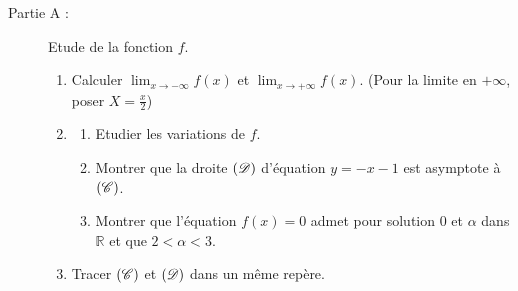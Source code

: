       \begin{description}
            \item[Partie A : ] Etude de la fonction $f$. \\[-1\baselineskip]
                  \begin{enumerate}
                        \item Calculer $\lim_{x\rightarrow -\infty} f(x)$ et $\lim_{x\rightarrow +\infty} f(x)$.
                              (Pour la limite en $+\infty$, poser $X = \frac{x}{2}$)
                        \item \begin{enumerate}
                                    \item Etudier les variations de $f$.
                                    \item Montrer que la droite $(\mathscr{D})$ d'\'equation $y = - x - 1$ est asymptote \`a $(\mathscr{C})$.
                                    \item Montrer que l'\'equation $f(x) = 0$ admet pour solution $0$ et $\alpha$ dans 
                                          $\mathbb{R}$ et que $2 < \alpha < 3$.
                              \end{enumerate}
                        \item Tracer $(\mathscr{C})$ et $(\mathscr{D})$ dans un m\^eme rep\`ere.
                              

\end{enumerate}
\end{description}
